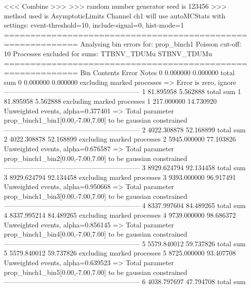  <<< Combine >>> 
>>> random number generator seed is 123456
>>> method used is AsymptoticLimits
Channel ch1 will use autoMCStats with settings: event-threshold=10, include-signal=0, hist-mode=1
============================================================
Analysing bin errors for: prop_binch1
Poisson cut-off: 10
Processes excluded for sums: TTBNV_TDUMu STBNV_TDUMu
============================================================
Bin        Contents        Error           Notes                         
0          0.000000        0.000000        total sum                     
0          0.000000        0.000000        excluding marked processes    
  => Error is zero, ignore      
------------------------------------------------------------
1          81.895958       5.562888        total sum                     
1          81.895958       5.562888        excluding marked processes    
1          217.000000      14.730920       Unweighted events, alpha=0.377401
  => Total parameter prop_binch1_bin1[0.00,-7.00,7.00] to be gaussian constrained
------------------------------------------------------------
2          4022.308878     52.168899       total sum                     
2          4022.308878     52.168899       excluding marked processes    
2          5945.000000     77.103826       Unweighted events, alpha=0.676587
  => Total parameter prop_binch1_bin2[0.00,-7.00,7.00] to be gaussian constrained
------------------------------------------------------------
3          8929.624794     92.134458       total sum                     
3          8929.624794     92.134458       excluding marked processes    
3          9393.000000     96.917491       Unweighted events, alpha=0.950668
  => Total parameter prop_binch1_bin3[0.00,-7.00,7.00] to be gaussian constrained
------------------------------------------------------------
4          8337.997604     84.489265       total sum                     
4          8337.995214     84.489265       excluding marked processes    
4          9739.000000     98.686372       Unweighted events, alpha=0.856145
  => Total parameter prop_binch1_bin4[0.00,-7.00,7.00] to be gaussian constrained
------------------------------------------------------------
5          5579.840012     59.737826       total sum                     
5          5579.840012     59.737826       excluding marked processes    
5          8725.000000     93.407708       Unweighted events, alpha=0.639523
  => Total parameter prop_binch1_bin5[0.00,-7.00,7.00] to be gaussian constrained
------------------------------------------------------------
6          4038.797697     47.794708       total sum                     
